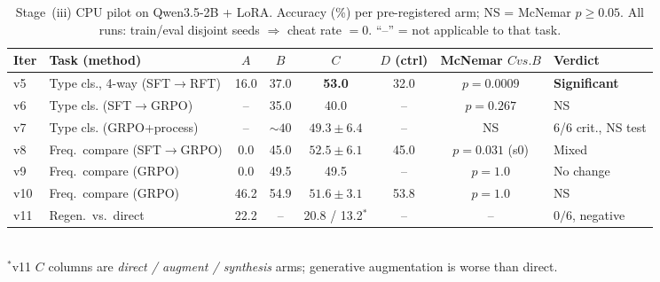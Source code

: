 \begin{table}[t]
\centering
\caption{Stage~(iii) CPU pilot on Qwen3.5-2B + LoRA. Accuracy (\%) per pre-registered arm; NS = McNemar $p{\geq}0.05$. All runs: train/eval disjoint seeds $\Rightarrow$ cheat rate $=0$. ``--'' = not applicable to that task.}
\label{tab:domain-rl}
\setlength{\tabcolsep}{4pt}
\scriptsize
\begin{tabular}{@{}llcccccl@{}}
\toprule
Iter & Task (method) & $A$ & $B$ & $C$ & $D$ (ctrl) & McNemar $C{ vs.}B$ & Verdict \\
\midrule
v5 & Type cls., 4-way (SFT$\to$RFT) & 16.0 & 37.0 & \textbf{53.0} & 32.0 & $p{=}0.0009$ & \textbf{Significant} \\
v6 & Type cls. (SFT$\to$GRPO) & -- & 35.0 & 40.0 & -- & $p{=}0.267$ & NS \\
v7 & Type cls. (GRPO+process) & -- & ${\sim}40$ & $49.3{\pm}6.4$ & -- & NS & 6/6 crit., NS test \\
v8 & Freq.\ compare (SFT$\to$GRPO) & 0.0 & 45.0 & $52.5{\pm}6.1$ & 45.0 & $p{=}0.031$ (s0) & Mixed \\
v9 & Freq.\ compare (GRPO) & 0.0 & 49.5 & 49.5 & -- & $p{=}1.0$ & No change \\
v10 & Freq.\ compare (GRPO) & 46.2 & 54.9 & $51.6{\pm}3.1$ & 53.8 & $p{=}1.0$ & NS \\
v11 & Regen.\ vs.\ direct & 22.2 & -- & 20.8 / 13.2$^*$ & -- & -- & $0/6$, negative \\
\bottomrule
\end{tabular}
\\[2pt]
\footnotesize $^*$v11 $C$ columns are \emph{direct / augment / synthesis} arms; generative augmentation is worse than direct.
\end{table}


